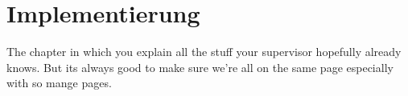 \documentclass[thesis.tex]{subfiles}
\begin{document}
\chapter{Implementierung}\label{chap:implementierung}
The chapter in which you explain all the stuff your supervisor hopefully already knows. But its always good to make sure we're all on the same page especially with so mange pages.

\subfilebib %
\end{document}
